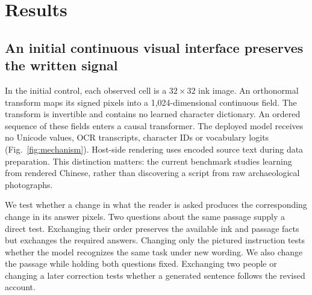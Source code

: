 

\section*{Results}
\subsection*{An initial continuous visual interface preserves the written signal}
In the initial control, each observed cell is a $32\times32$ ink image. An orthonormal transform maps
its signed pixels into a 1,024-dimensional continuous field. The transform is
invertible and contains no learned character dictionary. An ordered sequence
of these fields enters a causal transformer. The deployed model receives no
Unicode values, OCR transcripts, character IDs or vocabulary logits
(Fig.~\ref{fig:mechanism}). Host-side rendering uses encoded source text during
data preparation. This distinction matters: the current benchmark studies
learning from rendered Chinese, rather than discovering a script from raw
archaeological photographs.

We test whether a change in what the reader is asked produces the corresponding change in its answer pixels. Two questions about the same passage supply a direct test. Exchanging their order preserves the available ink and passage facts but exchanges the required answers. Changing only the pictured instruction tests whether the model recognizes the same task under new wording. We also change the passage while holding both questions fixed. Exchanging two people or changing a later correction tests whether a generated sentence follows the revised account.


